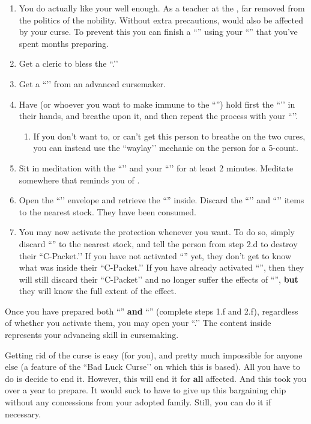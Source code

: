 \documentclass[green]{GL2020}
\begin{document}
\begin{enumerate}
  \begin{enumerate}
    \item You do actually like your \cMusic{\auncle{}} \cMusic{} well enough. As a teacher at the \pSchool{}, \cMusic{\they} \cMusic{\are} far removed from the politics of the \pFarm{} nobility. Without extra precautions, \cMusic{} would also be affected by your curse. To prevent this you can finish a ``\iProtection{}'' using your ``\iWIPProtection{}'' that you’ve spent months preparing.
    \item Get a cleric to bless the ``\iWIPProtection{}.’’
    \item Get a ``\iSlowActingPoisonCure{}’’ from an advanced cursemaker.
    \item Have \cMusic{} (or whoever you want to make immune to the ``\iWithering{}'') hold first the ``\iSlowActingPoisonCure{}’’ in their hands, and breathe upon it, and then repeat the process with your ``\iWIPProtection{}’’.
  \begin{enumerate}
    \item If you don’t want to, or can’t get this person to breathe on the two cures, you can instead use the ``waylay’’ mechanic on the person for a 5-count.
  \end{enumerate}
    \item Sit in meditation with the ``\iSlowActingPoisonCure{}’’ and your ``\iWIPProtection{}’’ for at least 2 minutes. Meditate somewhere that reminds you of \cFarmGod{}.
    \item Open the ``\iWIPProtection{}’’ envelope and retrieve the ``\iProtection{}'' inside. Discard the ``\iSlowActingPoisonCure{}’’ and ``\iWIPProtection{}’’ items to the nearest stock. They have been consumed.
    \item You may now activate the protection whenever you want. To do so, simply discard ``\iProtection{}'' to the nearest stock, and tell the person from step 2.d to destroy their ``C-Packet.’’ If you have not activated ``\iWithering{}'' yet, they don’t get to know what was inside their ``C-Packet.’’ If you have already activated ``\iWithering{}'', then they will still discard their ``C-Packet’’ and no longer suffer the effects of ``\iWithering{}'', \textbf{but} they will know the full extent of the effect.
  \end{enumerate}
\end{enumerate}

Once you have prepared both ``\iWithering{}'' \textbf{and} ``\iProtection{}'' (complete steps 1.f and 2.f), regardless of whether you activate them, you may open your ``\mPacketThree{}.’’ The content inside represents your advancing skill in cursemaking.

Getting rid of the curse is easy (for you), and pretty much impossible for anyone else (a feature of the ``Bad Luck Curse’’ on which this is based). All you have to do is decide to end it. However, this will end it for \textbf{all} affected. And this took you over a year to prepare. It would suck to have to give up this bargaining chip without any concessions from your adopted family. Still, you can do it if necessary.
\end{document}
